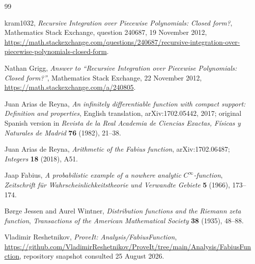 \documentclass[11pt,oneside]{article}
\theoremstyle{definition}
\theoremstyle{remark}
\begin{document}
\renewcommand{\refname}{Topic references}
\begin{thebibliography}{99}

kram1032,
\emph{Recursive Integration over Piecewise Polynomials: Closed form?},
Mathematics Stack Exchange, question 240687, 19 November 2012,
\url{https://math.stackexchange.com/questions/240687/recursive-integration-over-piecewise-polynomials-closed-form}.

Nathan Grigg,
\emph{Answer to ``Recursive Integration over Piecewise Polynomials: Closed form?''},
Mathematics Stack Exchange, 22 November 2012,
\url{https://math.stackexchange.com/a/240805}.

Juan Arias de Reyna,
\emph{An infinitely differentiable function with compact support: Definition and
properties},
English translation, arXiv:1702.05442, 2017; original Spanish version in
\emph{Revista de la Real Academia de Ciencias Exactas, Físicas y Naturales de Madrid}
\textbf{76} (1982), 21--38.

Juan Arias de Reyna,
\emph{Arithmetic of the Fabius function},
arXiv:1702.06487; \emph{Integers} \textbf{18} (2018), A51.

Jaap Fabius,
\emph{A probabilistic example of a nowhere analytic $C^\infty$-function},
\emph{Zeitschrift für Wahrscheinlichkeitstheorie und Verwandte Gebiete}
\textbf{5} (1966), 173--174.

Børge Jessen and Aurel Wintner,
\emph{Distribution functions and the Riemann zeta function},
\emph{Transactions of the American Mathematical Society}
\textbf{38} (1935), 48--88.

Vladimir Reshetnikov,
\emph{ProveIt: Analysis/FabiusFunction},
\url{https://github.com/VladimirReshetnikov/ProveIt/tree/main/Analysis/FabiusFunction},
repository snapshot consulted 25 August 2026.

\end{thebibliography}


\renewcommand{\arraystretch}{1}




\clearpage
\end{document}
